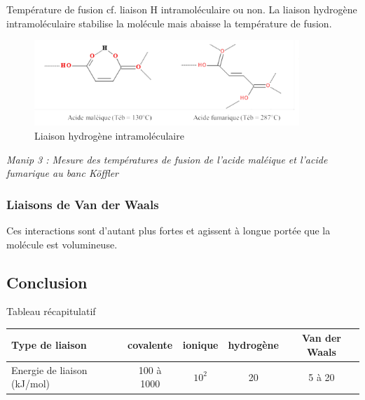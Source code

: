 \documentclass{article}%
\begin{document}
Température de fusion cf. liaison H intramoléculaire ou non. La liaison hydrogène intramoléculaire stabilise la molécule mais abaisse la température de fusion.

\begin{figure}
	\centerline{\includegraphics[width=10cm]{images/liaison_intramol.png}}
\caption{Liaison hydrogène intramoléculaire}
\end{figure}

\textit{Manip 3 : Mesure des températures de fusion de l’acide maléique et l’acide fumarique au banc Köffler}

\subsubsection{Liaisons de Van der Waals}


Ces interactions sont d'autant plus fortes et agissent à longue portée que la molécule est volumineuse.

\subsection{Conclusion}

Tableau récapitulatif

\begin{tabular}{|l|c|c|c|c|}
\hline
Type de liaison & covalente & ionique & hydrogène & Van der Waals \\
\hline
Energie de liaison (kJ/mol) & 100 à 1000 & $10^2$ & 20 & 5 à 20\\
\hline
\end{tabular}
\end{document}
